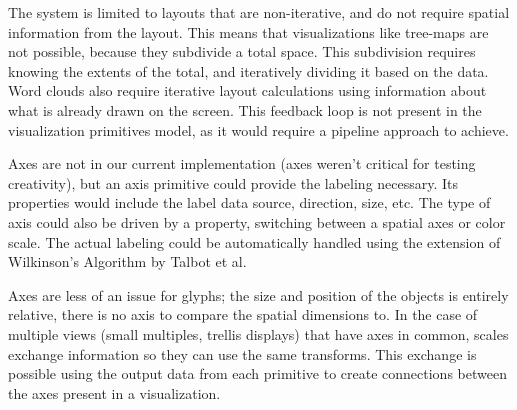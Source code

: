 The system is limited to layouts that are non-iterative, and do not require spatial information from the layout.
This means that visualizations like tree-maps are not possible, because they subdivide a total space.
This subdivision requires knowing the extents of the total, and iteratively dividing it based on the data.
Word clouds also require iterative layout calculations using information about what is already drawn on the screen.
This feedback loop is not present in the visualization primitives model, as it would require a pipeline approach to achieve.

Axes are not in our current implementation (axes weren't critical for testing creativity), but an axis primitive could provide the labeling necessary.
Its properties would include the label data source, direction, size, etc.
The type of axis could also be driven by a property, switching between a spatial axes or color scale.
The actual labeling could be automatically handled using the extension of Wilkinson's Algorithm by Talbot et al.~\cite{Talbot2010}

Axes are less of an issue for glyphs; the size and position of the objects is entirely relative, there is no axis to compare the spatial dimensions to.
In the case of multiple views (small multiples, trellis displays) that have axes in common, scales exchange information so they can use the same transforms.
This exchange is possible using the output data from each primitive to create connections between the axes present in a visualization.